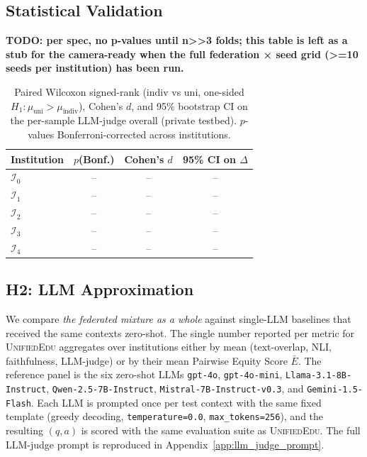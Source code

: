 \documentclass[11pt]{article}
\theoremstyle{plain}
\theoremstyle{definition}
\theoremstyle{remark}
\newcommand{\red}[1]{\textcolor{myred}{\textbf{#1}}}
\newcommand{\UniEdu}{\textsc{UnifiedEdu}}
\newcommand{\indiv}{\text{indiv}}
\newcommand{\uni}{\text{uni}}
\begin{document}
\subsection{Statistical Validation}
\label{sec:results_stats}

\red{TODO: per spec, no p-values until n>>3 folds; this table is left as a stub for the camera-ready when the full federation × seed grid (>=10 seeds per institution) has been run.}
\begin{table}[t]
\centering
\small
\caption{Paired Wilcoxon signed-rank ($\indiv$ vs
$\uni$, one-sided $H_1{:}\mu_{\uni}>\mu_{\indiv}$),
Cohen's $d$, and 95\% bootstrap CI on the per-sample
LLM-judge overall (private testbed). $p$-values
Bonferroni-corrected across institutions.}
\label{tab:wilcoxon}
\begin{tabular}{lccc}
\toprule
\textbf{Institution} & $p$\textbf{(Bonf.)} &
\textbf{Cohen's $d$} & \textbf{95\% CI on $\Delta$} \\
\midrule
$\mathcal{I}_0$ & -- & -- & -- \\
$\mathcal{I}_1$ & -- & -- & -- \\
$\mathcal{I}_2$ & -- & -- & -- \\
$\mathcal{I}_3$ & -- & -- & -- \\
$\mathcal{I}_4$ & -- & -- & -- \\
\bottomrule
\end{tabular}
\end{table}

\subsection{H2: LLM Approximation}
\label{sec:results_llm_approx}

We compare \emph{the federated mixture as a whole}
against single-LLM baselines that received the same
contexts zero-shot. The single number reported per
metric for \UniEdu{} aggregates over institutions
either by mean (text-overlap, NLI, faithfulness,
LLM-judge) or by their mean Pairwise Equity Score
$\bar{E}$. The reference panel is the six
zero-shot LLMs \texttt{gpt-4o},
\texttt{gpt-4o-mini},
\texttt{Llama-3.1-8B-Instruct},
\texttt{Qwen-2.5-7B-Instruct},
\texttt{Mistral-7B-Instruct-v0.3}, and
\texttt{Gemini-1.5-Flash}. Each LLM is prompted
once per test context with the same fixed template
(greedy decoding,
\texttt{temperature{=}0.0},
\texttt{max\_tokens{=}256}), and the resulting
$(q, a)$ is scored with the same evaluation suite
as \UniEdu{}. The full LLM-judge prompt is
reproduced in Appendix~\ref{app:llm_judge_prompt}.
\end{document}
